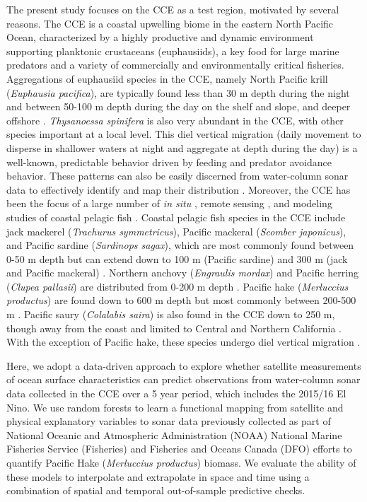 \documentclass[10pt,letterpaper]{article}
\begin{document}
The present study focuses on the CCE as a test region, motivated by several reasons. The CCE is a coastal upwelling biome in the eastern North Pacific Ocean, characterized by a highly productive and dynamic environment supporting planktonic crustaceans (euphausiids), a key food for large marine predators and a variety of commercially and environmentally critical fisheries. Aggregations of euphausiid species in the CCE, namely North Pacific krill (\emph{Euphausia pacifica}), are typically found less than 30 m depth during the night and between 50-100 m depth during the day on the shelf and slope, and deeper offshore \cite{ressler2005spatial}. \emph{Thysanoessa spinifera} is also very abundant in the CCE, with other species important at a local level. This diel vertical migration (daily movement to disperse in shallower waters at night and aggregate at depth during the day) is a well-known, predictable behavior driven by feeding and predator avoidance behavior. These patterns can also be easily discerned from water-column sonar data to effectively identify and map their distribution \cite{benoit2004diel} \cite{simmonds2008fisheries} \cite{ressler2005spatial} \cite{santora2011spatial}. Moreover, the CCE has been the focus of a large number of \emph{in situ} \cite{RUDNICK201764}, remote sensing \cite{KAHRU201594}, and modeling studies of coastal pelagic fish \cite{ROSE2015348}. Coastal pelagic fish species in the CCE include jack mackerel (\emph{Trachurus symmetricus}), Pacific mackeral (\emph{Scomber japonicus}), and Pacific sardine (\emph{Sardinops sagax}), which are most commonly found between 0-50 m depth but can extend down to 100 m (Pacific sardine) and 300 m (jack and Pacific mackeral) \cite{demer2012prediction}. Northern anchovy (\emph{Engraulis mordax}) and Pacific herring (\emph{Clupea pallasii}) are distributed from 0-200 m depth \cite{demer2012prediction}. Pacific hake (\emph{Merluccius productus}) are found down to 600 m depth but most commonly between 200-500 m \cite{demer2012prediction} \cite{ressler2007pacific}. Pacific saury (\emph{Colalabis saira}) is also found in the CCE down to 250 m, though away from the coast and limited to Central and Northern California \cite{demer2012prediction}. With the exception of Pacific hake, these species undergo diel vertical migration \cite{demer2012prediction}. 

Here, we adopt a data-driven approach to explore whether satellite measurements of ocean surface characteristics can predict observations from water-column sonar data collected in the CCE over a 5 year period, which includes the 2015/16 El Nino. We use random forests to learn a functional mapping from satellite and physical explanatory variables to sonar data previously collected as part of National Oceanic and Atmospheric Administration (NOAA) National Marine Fisheries Service (Fisheries) and Fisheries and Oceans Canada (DFO) efforts to quantify Pacific Hake (\emph{Merluccius productus}) biomass. We evaluate the ability of these models to interpolate and extrapolate in space and time using a combination of spatial and temporal out-of-sample predictive checks. 
\end{document}
